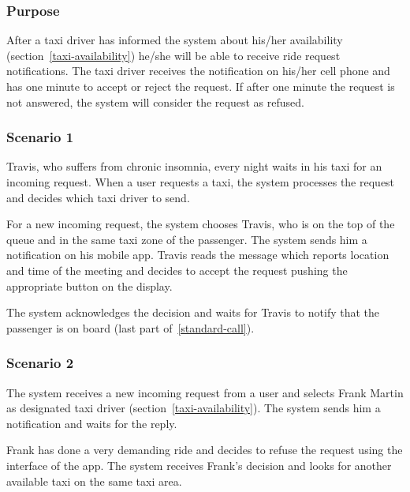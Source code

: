 \label{driver-notification}
\subsubsection{Purpose}

After a taxi driver has informed the system about his/her availability (section~\ref{taxi-availability})
he/she will be able to receive ride request notifications. The taxi driver receives the notification on his/her cell phone and has one minute to accept or reject the request. If after one minute the request is not answered, the system will consider the request as refused.

\subsubsection{Scenario 1}
Travis, who suffers from chronic insomnia, every night waits in his taxi for an incoming request. When a user requests a taxi, the system processes the request and decides which taxi driver to send.

For a new incoming request, the system chooses Travis, who is on the top of the queue and in the same taxi zone of the passenger. The system sends him a notification on his mobile app. Travis reads the message which reports location and time of the meeting and decides to accept the request pushing the appropriate button on the display.

The system acknowledges the decision and waits for Travis to notify that the passenger is on board (last part of~\ref{standard-call}).

\subsubsection{Scenario 2}
The system receives a new incoming request from a user and selects Frank Martin as designated taxi driver (section~\ref{taxi-availability}).
The system sends him a notification and waits for the reply.

Frank has done a very demanding ride and decides to refuse the request using the interface of the app. The system receives Frank's decision and looks for another available taxi on the same taxi area.

